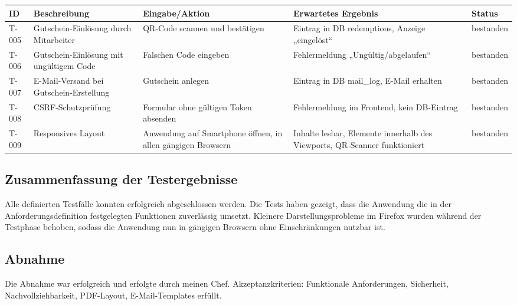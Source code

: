 \begin{center}
  \label{tab:testergebnisse2}
  \begin{tabularx}{\textwidth}{|L{1.2cm}|X|L{3.2cm}|L{3.2cm}|L{1.6cm}|}
    \hline
    \textbf{ID} & \textbf{Beschreibung}                   & \textbf{Eingabe/Aktion}                                     & \textbf{Erwartetes Ergebnis}                                              & \textbf{Status} \\
    \hline
    T-005       & Gutschein-Einlösung durch Mitarbeiter   & QR-Code scannen und bestätigen                              & Eintrag in DB redemptions, Anzeige „eingelöst“                            & bestanden       \\
    \hline
    T-006       & Gutschein-Einlösung mit ungültigem Code & Falschen Code eingeben                                      & Fehlermeldung „Ungültig/abgelaufen“                                       & bestanden       \\
    \hline
    T-007       & E-Mail-Versand bei Gutschein-Erstellung & Gutschein anlegen                                           & Eintrag in DB mail\_log, E-Mail erhalten                                  & bestanden       \\
    \hline
    T-008       & \ac{CSRF}-Schutzprüfung                 & Formular ohne gültigen Token absenden                       & Fehlermeldung im Frontend, kein DB-Eintrag                                & bestanden       \\
    \hline
    T-009       & Responsives Layout                      & Anwendung auf Smartphone öffnen, in allen gängigen Browsern & Inhalte lesbar, Elemente innerhalb des Viewports, QR-Scanner funktioniert & bestanden       \\
    \hline
  \end{tabularx}
\end{center}

\subsection{Zusammenfassung der Testergebnisse}
\label{sec:Testergebnisse2}
Alle definierten Testfälle konnten erfolgreich abgeschlossen werden.
Die Tests haben gezeigt, dass die Anwendung die in der Anforderungsdefinition festgelegten Funktionen zuverlässig umsetzt.
Kleinere Darstellungsprobleme im Firefox wurden während der Testphase behoben, sodass die Anwendung nun in gängigen Browsern ohne Einschränkungen nutzbar ist.

\subsection{Abnahme}
Die Abnahme war erfolgreich und erfolgte durch meinen Chef.
Akzeptanzkriterien: Funktionale Anforderungen, Sicherheit, Nachvollziehbarkeit, PDF-Layout, E-Mail-Templates erfüllt.
